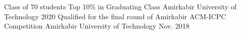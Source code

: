 \documentclass[11pt, a4paper]{awesome-cv}
\begin{document}
\begin{cventries}
	
	\cventry
	{Class of 70 students} %
	{Top 10\% in Graduating Class} %
	{Amirkabir University of Technology} %
	{2020} %
	{	}
	\cventry
	{} %
	{Qualified for the final round of Amirkabir ACM-ICPC Competition} %
	{Amirkabir University of Technology} %
	{Nov. 2018} %
	{	}
	
\end{cventries}


\end{document}
